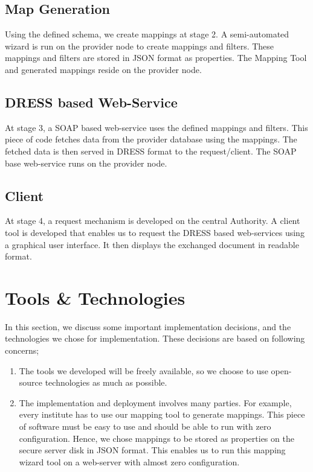 \documentclass[12pt,a4paper,oneside]{book}
\begin{document}
\subsection{Map Generation}
Using the defined schema, we create mappings at stage 2. A semi-automated wizard is run on the provider node to create mappings and filters. These mappings and filters are stored in JSON format as properties.  The Mapping Tool and generated mappings reside on the provider node.

\subsection{DRESS based Web-Service}
At stage 3, a SOAP based web-service uses the defined mappings and filters. This piece of code fetches data from the provider database using the mappings. The fetched data is then served in DRESS format to the  request/client. The SOAP base web-service runs on the provider node. 

\subsection{Client}
At stage 4, a request mechanism is developed on the central Authority. A client tool is developed that enables us to request the DRESS based web-services using a graphical user interface. It then displays the exchanged document in readable format.

\section{Tools \& Technologies}
In this section, we discuss some important implementation decisions, and the technologies we chose for implementation. These decisions are based on following concerns;

\begin{enumerate}

\item The tools we developed will be freely available, so we choose to use open-source technologies as much as possible.

\item The implementation and deployment involves many parties. For example, every institute has to use our mapping tool to generate mappings. This piece of software must be easy to use and should be able to run with zero configuration. Hence, we chose mappings to be stored as properties on the secure server disk in JSON format. This enables us to run this mapping wizard tool on a web-server with almost zero configuration.	

\end{enumerate}
\end{document}
